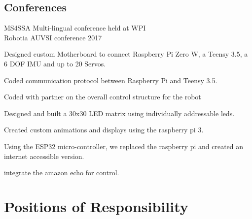 \documentclass[]{deedy-resume-openfont}
\begin{document}
\hfill
\begin{minipage}[t]{0.33\textwidth} 
\subsection{Conferences}
MS4SSA Multi-lingual conference held at WPI\\
Robotia AUVSI conference 2017 \\
\sectionsep
\end{minipage} 
\hfill
\begin{minipage}[t]{0.66\textwidth} 
\begin{tightemize} 
\item Designed custom Motherboard to connect Raspberry Pi Zero W, a Teensy 3.5, a 6 DOF IMU and up to 20 Servos. 
\item Coded communication protocol between Raspberry Pi and Teensy 3.5.
\item Coded with partner on the overall control structure for the robot
\end{tightemize}
\begin{tightemize} 
\item Designed and built a 30x30 LED matrix using individually addressable leds.
\item Created custom animations and displays using the raspberry pi 3.
\item Using the ESP32 micro-controller, we replaced the raspberry pi and created an internet accessible version.
\item integrate the amazon echo for control.
\end{tightemize}
\section{Positions of Responsibility}
\vspace{\topsep}
\newpage
{}

\end{minipage}
\end{document}
